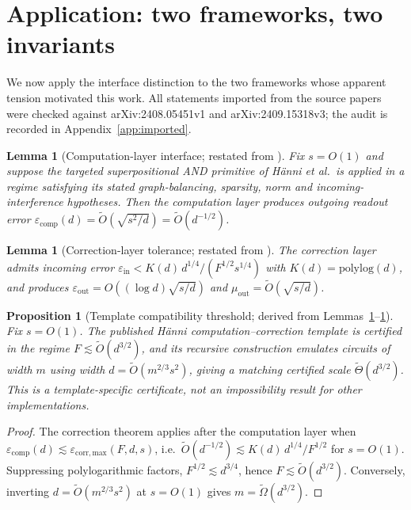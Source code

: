 \documentclass[preprint,12pt]{elsarticle}
\newtheorem{lemma}[theorem]{Lemma}
\newtheorem{proposition}[theorem]{Proposition}
\theoremstyle{definition}
\newcommand{\Otilde}{\widetilde{O}}
\newcommand{\Omegatilde}{\widetilde{\Omega}}
\newcommand{\Thetatilde}{\widetilde{\Theta}}
\newcommand{\ecomp}{\varepsilon_{\mathrm{comp}}}
\newcommand{\ecorr}{\varepsilon_{\mathrm{corr,max}}}
\begin{document}
\section{Application: two frameworks, two invariants}
\label{sec:application}

We now apply the interface distinction to the two frameworks whose apparent tension motivated
this work. All statements imported from the source papers were checked against
arXiv:2408.05451v1 and arXiv:2409.15318v3; the audit is recorded in
Appendix~\ref{app:imported}.

\begin{lemma}[Computation-layer interface; restated from {\cite[Thm.~11]{hanni2024superposition}}]
\label{lem:comp}
Fix $s=O(1)$ and suppose the targeted superpositional AND primitive of H\"{a}nni et al.\ is
applied in a regime satisfying its stated graph-balancing, sparsity, norm and
incoming-interference hypotheses. Then the computation layer produces outgoing readout error
$\ecomp(d)=\Otilde(\sqrt{s^2/d})=\Otilde(d^{-1/2})$.
\end{lemma}

\begin{lemma}[Correction-layer tolerance; restated from {\cite[Thm.~21]{hanni2024superposition}}]
\label{lem:corr}
The correction layer admits incoming error
$\varepsilon_{\mathrm{in}}<K(d)\,d^{1/4}/(F^{1/2}s^{1/4})$ with $K(d)=\mathrm{polylog}(d)$, and
produces $\varepsilon_{\mathrm{out}}=O((\log d)\sqrt{s/d})$ and
$\mu_{\mathrm{out}}=\Otilde(\sqrt{s/d})$.
\end{lemma}

\begin{proposition}[Template compatibility threshold; derived from Lemmas~\ref{lem:comp}--\ref{lem:corr}]
\label{prop:hanni}
Fix $s=O(1)$. The published H\"{a}nni computation--correction template is certified in the
regime $F\lesssim\Otilde(d^{3/2})$, and its recursive construction emulates circuits of width
$m$ using width $d=\Otilde(m^{2/3}s^2)$, giving a matching certified scale
$\Thetatilde(d^{3/2})$. This is a template-specific certificate, not an impossibility result
for other implementations.
\end{proposition}

\begin{proof}
The correction theorem applies after the computation layer when $\ecomp(d)\lesssim
\ecorr(F,d,s)$, i.e.\ $\Otilde(d^{-1/2})\lesssim K(d)\,d^{1/4}/F^{1/2}$ for $s=O(1)$.
Suppressing polylogarithmic factors, $F^{1/2}\lesssim d^{3/4}$, hence
$F\lesssim\Otilde(d^{3/2})$. Conversely, inverting $d=\Otilde(m^{2/3}s^2)$ at $s=O(1)$ gives
$m=\Omegatilde(d^{3/2})$.
\end{proof}
\end{document}
